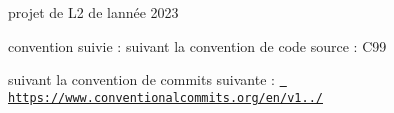 projet de L2 de l\textquotesingle{}année 2023

convention suivie \+: suivant la convention de code source \+: C99

suivant la convention de commits suivante \+: \href{https://www.conventionalcommits.org/en/v1.0.0/}{\texttt{ https\+://www.\+conventionalcommits.\+org/en/v1../}} 
